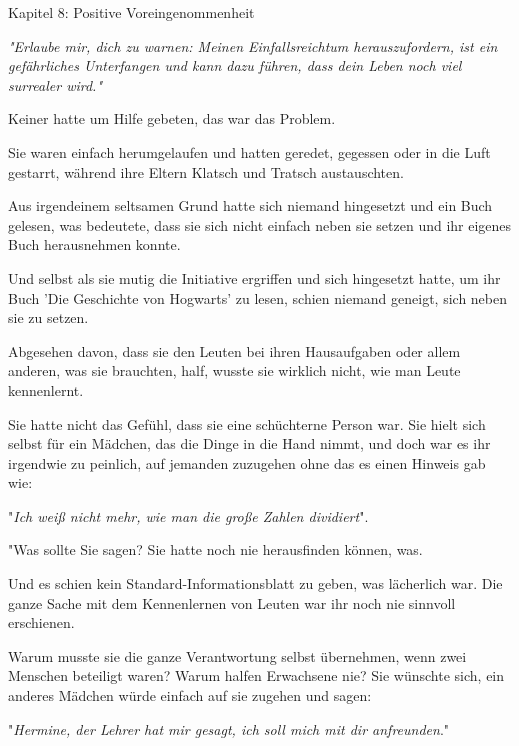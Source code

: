 

\hypertarget{positive-voreingenommenheit}{%

Kapitel 8: Positive Voreingenommenheit

\emph{\hfill\break "Erlaube mir, dich zu warnen: Meinen Einfallsreichtum herauszufordern, ist ein gefährliches Unterfangen und kann dazu führen, dass dein Leben noch viel surrealer wird."}

Keiner hatte um Hilfe gebeten, das war das Problem.

Sie waren einfach herumgelaufen und hatten geredet, gegessen oder in die Luft gestarrt, während ihre Eltern Klatsch und Tratsch austauschten.

Aus irgendeinem seltsamen Grund hatte sich niemand hingesetzt und ein Buch gelesen, was bedeutete, dass sie sich nicht einfach neben sie setzen und ihr eigenes Buch herausnehmen konnte.

Und selbst als sie mutig die Initiative ergriffen und sich hingesetzt hatte, um ihr Buch 'Die Geschichte von Hogwarts' zu lesen, schien niemand geneigt, sich neben sie zu setzen.

Abgesehen davon, dass sie den Leuten bei ihren Hausaufgaben oder allem anderen, was sie brauchten, half, wusste sie wirklich nicht, wie man Leute kennenlernt.

Sie hatte nicht das Gefühl, dass sie eine schüchterne Person war. Sie hielt sich selbst für ein Mädchen, das die Dinge in die Hand nimmt, und doch war es ihr irgendwie zu peinlich, auf jemanden zuzugehen ohne das es einen Hinweis gab wie:

"\emph{Ich weiß nicht mehr, wie man die große Zahlen dividiert}".

"Was sollte Sie sagen? Sie hatte noch nie herausfinden können, was.

Und es schien kein Standard-Informationsblatt zu geben, was lächerlich war. Die ganze Sache mit dem Kennenlernen von Leuten war ihr noch nie sinnvoll erschienen.

Warum musste sie die ganze Verantwortung selbst übernehmen, wenn zwei Menschen beteiligt waren? Warum halfen Erwachsene nie? Sie wünschte sich, ein anderes Mädchen würde einfach auf sie zugehen und sagen:

"\emph{Hermine, der Lehrer hat mir gesagt, ich soll mich mit dir anfreunden}."

}
